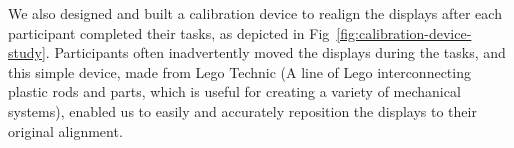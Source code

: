 \begin{invisBox}
	\hfill
\end{invisBox}

We also designed and built a calibration device to realign the displays after each participant completed their tasks, as depicted in Fig~\ref{fig:calibration-device-study}. Participants often inadvertently moved the displays during the tasks, and this simple device, made from Lego Technic (A line of Lego interconnecting plastic rods and parts, which is useful for creating a variety of mechanical systems), enabled us to easily and accurately reposition the displays to their original alignment.

